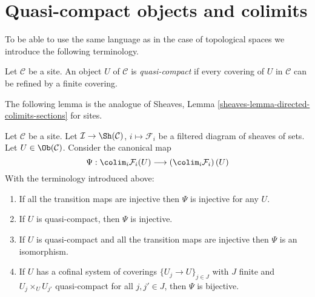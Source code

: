 \section{Quasi-compact objects and colimits}
\label{section-quasi-compact}

\noindent
To be able to use the same language as in the case of topological spaces
we introduce the following terminology.

\begin{definition}
\label{definition-quasi-compact}
Let $\mathcal{C}$ be a site. An object $U$ of $\mathcal{C}$ is
{\it quasi-compact} if every covering of $U$ in $\mathcal{C}$
can be refined by a finite covering.
\end{definition}

\noindent
The following lemma is the analogue of
Sheaves, Lemma \ref{sheaves-lemma-directed-colimits-sections}
for sites.

\begin{lemma}
\label{lemma-directed-colimits-sections}
Let $\mathcal{C}$ be a site. Let
$\mathcal{I} \to \Sh(\mathcal{C})$, $i \mapsto \mathcal{F}_i$
be a filtered diagram of sheaves of sets.
Let $U \in \Ob(\mathcal{C})$.
Consider the canonical map
$$
\Psi :
\colim_i \mathcal{F}_i(U)
\longrightarrow
\left(\colim_i \mathcal{F}_i\right)(U)
$$
With the terminology introduced above:
\begin{enumerate}
\item If all the transition maps are injective then
$\Psi$ is injective for any $U$.
\item If $U$ is quasi-compact, then $\Psi$ is injective.
\item If $U$ is quasi-compact and all the transition maps are injective
then $\Psi$ is an isomorphism.
\item If $U$ has a cofinal system of coverings
$\{U_j \to U\}_{j \in J}$ with
$J$ finite and $U_j \times_U U_{j'}$ quasi-compact
for all $j, j' \in J$, then $\Psi$ is bijective.
\end{enumerate}
\end{lemma}


